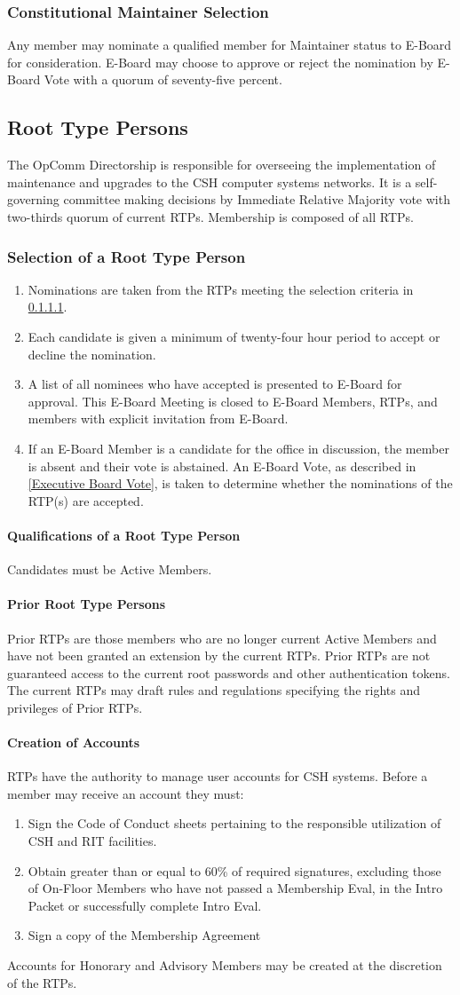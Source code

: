\documentclass{article}
\newcommand{\asection}[1]{\subsection{#1} \label{#1}}
\newcommand{\asubsection}[1]{\subsubsection{#1} \label{#1}}
\newcommand{\asubsubsection}[1]{\paragraph{#1} \label{#1}}
\begin{document}
\asubsection{Constitutional Maintainer Selection}
Any member may nominate a qualified member for Maintainer status to E-Board for consideration.
E-Board may choose to approve or reject the nomination by E-Board Vote with a quorum of seventy-five percent.

\asection{Root Type Persons}
The OpComm Directorship is responsible for overseeing the implementation of maintenance and upgrades to the CSH computer systems networks.
It is a self-governing committee making decisions by Immediate Relative Majority vote with two-thirds quorum of current RTPs.
Membership is composed of all RTPs.

\asubsection{Selection of a Root Type Person}
\renewcommand{\theenumi}{\alph{enumi}} %
\begin{enumerate}
	\item Nominations are taken from the RTPs meeting the selection criteria in \ref{Qualifications of a Root Type Person}.
	\item Each candidate is given a minimum of twenty-four hour period to accept or decline the nomination.
	\item A list of all nominees who have accepted is presented to E-Board for approval.
	      This E-Board Meeting is closed to E-Board Members, RTPs, and members with explicit invitation from E-Board.
	\item If an E-Board Member is a candidate for the office in discussion, the member is absent and their vote is abstained.
	      An E-Board Vote, as described in \ref{Executive Board Vote}, is taken to determine whether the nominations of the RTP(s) are accepted.
\end{enumerate}

\asubsubsection{Qualifications of a Root Type Person}
Candidates must be Active Members.

\asubsubsection{Prior Root Type Persons}
Prior RTPs are those members who are no longer current Active Members and have not been granted an extension by the current RTPs.
Prior RTPs are not guaranteed access to the current root passwords and other authentication tokens.
The current RTPs may draft rules and regulations specifying the rights and privileges of Prior RTPs.

\asubsubsection{Creation of Accounts}
RTPs have the authority to manage user accounts for CSH systems.
Before a member may receive an account they must:
\renewcommand{\theenumi}{\arabic{enumi}} %
\begin{enumerate}
	\item Sign the Code of Conduct sheets pertaining to the responsible utilization of CSH and RIT facilities.
	\item Obtain greater than or equal to 60\% of required signatures, excluding those of On-Floor Members who have not passed a Membership Eval, in the Intro Packet or successfully complete Intro Eval.
	\item Sign a copy of the Membership Agreement
\end{enumerate}
Accounts for Honorary and Advisory Members may be created at the discretion of the RTPs.
\end{document}
